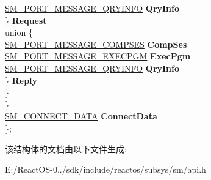 \begin{DoxyCompactItemize}
\begin{tabbing}
\>\>\>\>\hyperlink{struct___s_m___p_o_r_t___m_e_s_s_a_g_e___q_r_y_i_n_f_o}{SM\_PORT\_MESSAGE\_QRYINFO} {\bfseries QryInfo}\\
\>\>\>\} {\bfseries Request}\\
\>\>\>union \{\\
\>\>\>\>\hyperlink{struct___s_m___p_o_r_t___m_e_s_s_a_g_e___c_o_m_p_s_e_s}{SM\_PORT\_MESSAGE\_COMPSES} {\bfseries CompSes}\\
\>\>\>\>\hyperlink{struct___s_m___p_o_r_t___m_e_s_s_a_g_e___e_x_e_c_p_g_m}{SM\_PORT\_MESSAGE\_EXECPGM} {\bfseries ExecPgm}\\
\>\>\>\>\hyperlink{struct___s_m___p_o_r_t___m_e_s_s_a_g_e___q_r_y_i_n_f_o}{SM\_PORT\_MESSAGE\_QRYINFO} {\bfseries QryInfo}\\
\>\>\>\} {\bfseries Reply}\\
\>\>\} \\
\>\} \\
\>\hyperlink{struct___s_m___c_o_n_n_e_c_t___d_a_t_a}{SM\_CONNECT\_DATA} {\bfseries ConnectData}\\
\}; \\

\end{tabbing}\end{DoxyCompactItemize}


该结构体的文档由以下文件生成\+:\begin{DoxyCompactItemize}
\item 
E\+:/\+React\+O\+S-\/0../sdk/include/reactos/subsys/sm/api.\+h\end{DoxyCompactItemize}
